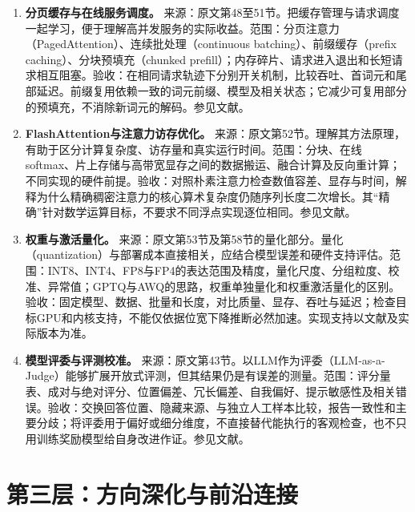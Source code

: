 \documentclass[UTF8,12pt,a4paper,fontset=fandol]{ctexart}
\begin{document}
\begin{enumerate}[resume=techrank]
\item \textbf{分页缓存与在线服务调度。}\label{tech:scheduling}
来源：原文第48至51节。把缓存管理与请求调度一起学习，便于理解高并发服务的实际收益。范围：分页注意力（PagedAttention）、连续批处理（continuous batching）、前缀缓存（prefix caching）、分块预填充（chunked prefill）；内存碎片、请求进入退出和长短请求相互阻塞。验收：在相同请求轨迹下分别开关机制，比较吞吐、首词元和尾部延迟。前缀复用依赖一致的词元前缀、模型及相关状态；它减少可复用部分的预填充，不消除新词元的解码。参见文献\cite{vllmfeatures,prefix}。

\item \textbf{FlashAttention与注意力访存优化。}\label{tech:flash}
来源：原文第52节。理解其方法原理，有助于区分计算复杂度、访存量和真实运行时间。范围：分块、在线softmax、片上存储与高带宽显存之间的数据搬运、融合计算及反向重计算；不同实现的硬件前提。验收：对照朴素注意力检查数值容差、显存与时间，解释为什么精确稠密注意力的核心算术复杂度仍随序列长度二次增长。其“精确”针对数学运算目标，不要求不同浮点实现逐位相同。参见文献\cite{flash}。

\item \textbf{权重与激活量化。}\label{tech:quantization}
来源：原文第53节及第58节的量化部分。量化（quantization）与部署成本直接相关，应结合模型误差和硬件支持评估。范围：INT8、INT4、FP8与FP4的表达范围及精度，量化尺度、分组粒度、校准、异常值；GPTQ与AWQ的思路，权重单独量化和权重激活量化的区别。验收：固定模型、数据、批量和长度，对比质量、显存、吞吐与延迟；检查目标GPU和内核支持，不能仅依据位宽下降推断必然加速。实现支持以文献\cite{vllmquant}及实际版本为准。

\item \textbf{模型评委与评测校准。}\label{tech:judge}
来源：原文第43节。以LLM作为评委（LLM-as-a-Judge）能够扩展开放式评测，但其结果仍是有误差的测量。范围：评分量表、成对与绝对评分、位置偏差、冗长偏差、自我偏好、提示敏感性及相关错误。验收：交换回答位置、隐藏来源、与独立人工样本比较，报告一致性和主要分歧；将评委用于偏好或细分维度，不直接替代能执行的客观检查，也不只用训练奖励模型给自身改进作证。参见文献\cite{judge}。
\end{enumerate}

\section{第三层：方向深化与前沿连接}
\label{sec:advanced}
\end{document}
